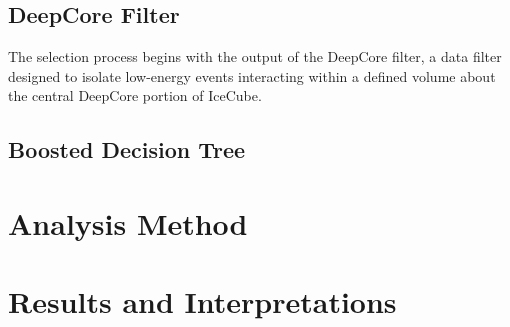 \documentclass[manuscript]{aastex}
\begin{document}
\subsection{DeepCore Filter}
The selection process begins with the output of the DeepCore filter, a data filter designed to isolate low-energy events interacting within a defined volume about the central DeepCore portion of IceCube.
\subsection{Boosted Decision Tree}

\section{Analysis Method}


\section{Results and Interpretations}




\end{document}
